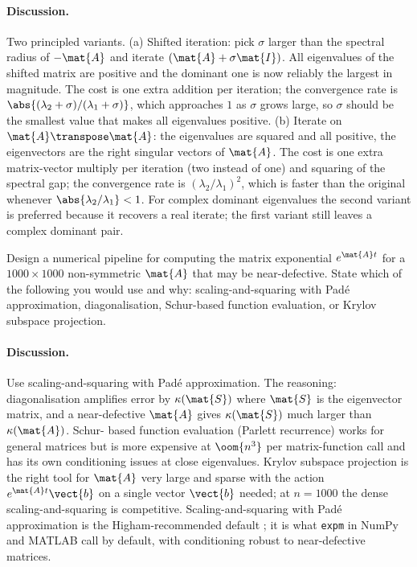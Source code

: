 \paragraph{Discussion.}
Two principled variants. (a) Shifted iteration: pick $\sigma$
larger than the spectral radius of $-\mat{A}$ and iterate
$(\mat{A} + \sigma \mat{I})$. All eigenvalues of the shifted matrix
are positive and the dominant one is now reliably the largest in
magnitude. The cost is one extra addition per iteration; the
convergence rate is $\abs{(\lambda_{2} + \sigma)/(\lambda_{1} +
\sigma)}$, which approaches $1$ as $\sigma$ grows large, so $\sigma$
should be the smallest value that makes all eigenvalues positive.
(b) Iterate on $\mat{A}\transpose \mat{A}$: the eigenvalues are
squared and all positive, the eigenvectors are the right singular
vectors of $\mat{A}$. The cost is one extra matrix-vector multiply
per iteration (two instead of one) and squaring of the spectral
gap; the convergence rate is $(\lambda_{2}/\lambda_{1})^{2}$, which
is faster than the original whenever $\abs{\lambda_{2}/\lambda_{1}}
< 1$. For complex dominant eigenvalues the second variant is
preferred because it recovers a real iterate; the first variant
still leaves a complex dominant pair.

\begin{exercise}
Design a numerical pipeline for computing the matrix exponential
$e^{\mat{A} t}$ for a $1000 \times 1000$ non-symmetric $\mat{A}$
that may be near-defective. State which of the following you would
use and why: scaling-and-squaring with Pad\'e approximation,
diagonalisation, Schur-based function evaluation, or Krylov
subspace projection.
\end{exercise}

\paragraph{Discussion.}
Use scaling-and-squaring with Pad\'e approximation. The reasoning:
diagonalisation amplifies error by $\kappa(\mat{S})$ where
$\mat{S}$ is the eigenvector matrix, and a near-defective $\mat{A}$
gives $\kappa(\mat{S})$ much larger than $\kappa(\mat{A})$. Schur-
based function evaluation (Parlett recurrence) works for general
matrices but is more expensive at $\oom{n^{3}}$ per matrix-function
call and has its own conditioning issues at close eigenvalues.
Krylov subspace projection is the right tool for $\mat{A}$ very
large and sparse with the action $e^{\mat{A} t} \vect{b}$ on a
single vector $\vect{b}$ needed; at $n = 1000$ the dense
scaling-and-squaring is competitive. Scaling-and-squaring with Pad\'e
approximation is the Higham-recommended default
\cite[ch.~10]{text:v2ch10-higham-functions2008}; it is what
\texttt{expm} in NumPy and MATLAB call by default, with conditioning
robust to near-defective matrices.


